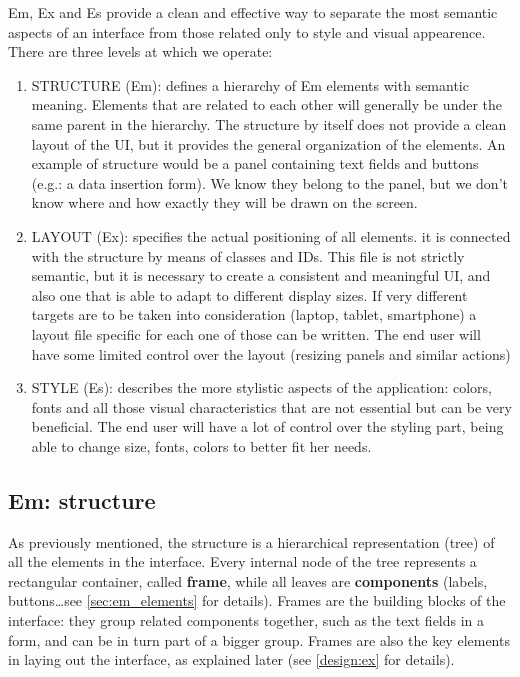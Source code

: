 Em, Ex and Es provide a clean and effective way to separate the most semantic aspects of an interface from those related only to style and visual appearence. There are three levels at which we operate:
\begin{enumerate}
    \item STRUCTURE (Em): defines a hierarchy of Em elements with semantic meaning. Elements that are related to each other will generally be under the same parent in the hierarchy. The structure by itself does not provide a clean layout of the UI, but it provides the general organization of the elements. An example of structure would be a panel containing text fields and buttons (e.g.: a data insertion form). We know they belong to the panel, but we don't know where and how exactly they will be drawn on the screen.
    \item LAYOUT (Ex): specifies the actual positioning of all elements. it is connected with the structure by means of classes and IDs. This file is not strictly semantic, but it is necessary to create a consistent and meaningful UI, and also one that is able to adapt to different display sizes. If very different targets are to be taken into consideration (laptop, tablet, smartphone) a layout file specific for each one of those can be written. The end user will have some limited control over the layout (resizing panels and similar actions)
    \item STYLE (Es): describes the more stylistic aspects of the application: colors, fonts and all those visual characteristics that are not essential but can be very beneficial. The end user will have a lot of control over the styling part, being able to change size, fonts, colors to better fit her needs.
\end{enumerate}

\subsection{Em: structure}

As previously mentioned, the structure is a hierarchical representation (tree) of all the elements in the interface. Every internal node of the tree represents a rectangular container, called \textbf{frame}, while all leaves are \textbf{components} (labels, buttons\ldots see \ref{sec:em_elements} for details). Frames are the building blocks of the interface: they group related components together, such as the text fields in a form, and can be in turn part of a bigger group. Frames are also the key elements in laying out the interface, as explained later (see \ref{design:ex} for details).

